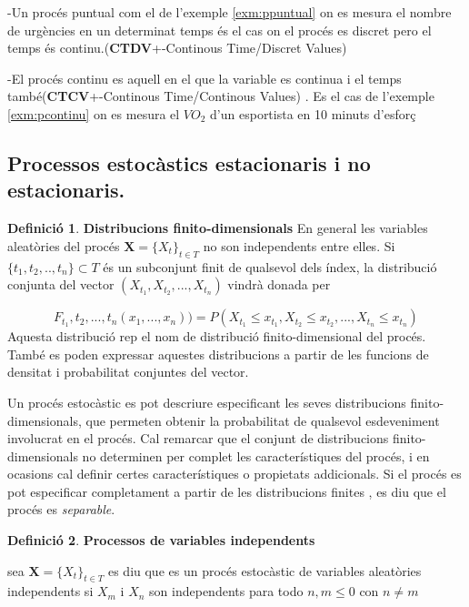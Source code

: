 \documentclass[
  catalan,
]{article}
\theoremstyle{definition}
\newtheorem{definition}{Definició}[section]
\theoremstyle{definition}
\theoremstyle{definition}
\theoremstyle{definition}
\theoremstyle{remark}
\begin{document}
-Un procés puntual com el de l'exemple \ref{exm:ppuntual} on es mesura el nombre de urgències en un determinat temps és el cas on el procés es discret pero el temps és continu.(\textbf{CTDV}+-Continous Time/Discret Values)

-El procés continu es aquell en el que la variable es continua i el temps també(\textbf{CTCV}+-Continous Time/Continous Values) . Es el cas de l'exemple \ref{exm:pcontinu} on es mesura el \(VO_2\) d'un esportista en 10 minuts d'esforç

\subsection{Processos estocàstics estacionaris i no estacionaris.}\label{processos-estocuxe0stics-estacionaris-i-no-estacionaris.}

\begin{definition}
\textbf{Distribucions finito-dimensionals}
En general les variables aleatòries del procés \(\textbf{X}=\{X_t\}_{t \in T}\) no son independents entre elles. Si \(\{ t_1,t_2,..,t_n\} \subset T\) és un subconjunt finit de qualsevol dels índex, la distribució conjunta del vector \((X_{t_1},X_{t_2},...,X_{t_n})\) vindrà donada per

\[
F_{t_1},{t_2},...,{t_n}(x_1,...,x_n))=P(X_{t_1}\leq x_{t_1},X_{t_2}\leq x_{t_2},...,X_{t_n}\leq x_{t_n})   
\]
Aquesta distribució rep el nom de distribució finito-dimensional del procés. També es poden expressar aquestes distribucions a partir de les funcions de densitat i probabilitat conjuntes del vector.
\end{definition}

Un procés estocàstic es pot descriure especificant les seves distribucions finito-dimensionals, que permeten obtenir la probabilitat de qualsevol esdeveniment involucrat en el procés. Cal remarcar que el conjunt de distribucions finito-dimensionals no determinen per complet les característiques del procés, i en ocasions cal definir certes característiques o propietats addicionals. Si el procés es pot especificar completament a partir de les distribucions finites , es diu que el procés es \emph{separable}.

\begin{definition}
\textbf{Processos de variables independents}

sea \(\textbf{X}=\{X_t\}_{t \in T}\) es diu que es un procés estocàstic de variables aleatòries independents si \(X_m\) i \(X_n\) son independents para todo \(n,m \leq 0\) con \(n \neq m\)
\end{definition}
\end{document}
